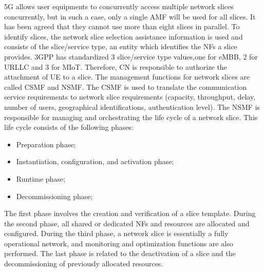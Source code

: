 \documentclass[a4paper,12pt]{report} %
\begin{document}
5G allows user equipments to concurrently
access multiple
network slices concurrently, but in such a
case, only a single AMF will be used for all slices.
It has been agreed that they cannot use more
than eight slices in parallel.
To identify slices, the network slice selection assistance
information is used and consists of
the slice/service type, an entity which identifies the
NFs a slice provides. 3GPP has
standardized 3 slice/service type values,one for eMBB,
2 for URLLC and 3 for MIoT. Therefore, CN
is responsible to authorize the attachment of UE
to a slice.
The management functions for network
slices are called \gls{CSMF} and \gls{NSMF}. The CSMF is used
to translate the communication service requirements
to network slice requirements (capacity,
throughput, delay, number of users, geographical
identifications, authentication level). The
NSMF is responsible for managing and orchestrating
the life cycle of a network slice. This life cycle
consists of the following phases:
\begin{itemize}
\item Preparation phase;

\item Instantiation, configuration, and activation
phase;

\item Runtime phase;

\item Decommissioning phase;

\end{itemize}
The first phase involves the creation and verification
of a slice template. During the second phase,
all shared or dedicated NFs and resources are
allocated and configured. During the third phase,
a network slice is essentially a fully operational
network, and monitoring and optimization functions
are also performed. The last phase is related
to the deactivation of a slice and the decommissioning
of previously allocated resources.



\newpage
\end{document}
